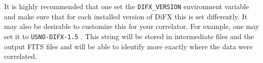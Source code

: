 It is highly recommended that one set the {\tt DIFX\_VERSION} environment variable and make sure that for each installed version of DiFX this is set differently.
It may also be desirable to customize this for your correlator.
For example, one may set it to {\tt USNO-DIFX-1.5} .
This string will be stored in intermediate files and the output FITS files and will be able to identify more exactly where the data were correlated.
